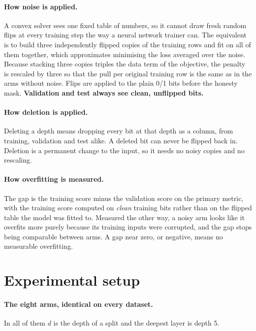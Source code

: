 \documentclass[11pt,a4paper]{article}
\begin{document}
\paragraph{How noise is applied.} A convex solver sees one fixed table of
numbers, so it cannot draw fresh random flips at every training step the way a
neural network trainer can. The equivalent is to build three independently
flipped copies of the training rows and fit on all of them together, which
approximates minimising the loss averaged over the noise. Because stacking
three copies triples the data term of the objective, the penalty is rescaled
by three so that the pull per original training row is the same as in the
arms without noise. Flips are applied to the plain 0/1 bits before the honesty
mask. \textbf{Validation and test always see clean, unflipped bits.}

\paragraph{How deletion is applied.} Deleting a depth means dropping every bit
at that depth as a column, from training, validation and test alike. A deleted
bit can never be flipped back in. Deletion is a permanent change to the input,
so it needs no noisy copies and no rescaling.

\paragraph{How overfitting is measured.} The gap is the training score minus
the validation score on the primary metric, with the training score computed
on \emph{clean} training bits rather than on the flipped table the model was
fitted to. Measured the other way, a noisy arm looks like it overfits more
purely because its training inputs were corrupted, and the gap stops being
comparable between arms. A gap near zero, or negative, means no measurable
overfitting.

\section{Experimental setup}

\paragraph{The eight arms, identical on every dataset.} In all of them $d$ is
the depth of a split and the deepest layer is depth 5.
\end{document}
